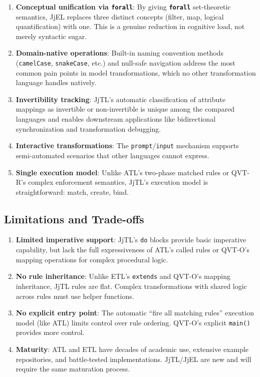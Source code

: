 \documentclass[11pt,a4paper]{article}
\newcommand{\jjel}{\textsf{JjEL}}
\newcommand{\jjtl}{\textsf{JjTL}}
\newcommand{\kw}[1]{\texttt{\textbf{#1}}}
\begin{document}
\begin{enumerate}
    \item \textbf{Conceptual unification via \kw{forall}}: By giving \kw{forall} set-theoretic semantics, \jjel{} replaces three distinct concepts (filter, map, logical quantification) with one. This is a genuine reduction in cognitive load, not merely syntactic sugar.

    \item \textbf{Domain-native operations}: Built-in naming convention methods (\texttt{camelCase}, \texttt{snakeCase}, etc.) and null-safe navigation address the most common pain points in model transformations, which no other transformation language handles natively.

    \item \textbf{Invertibility tracking}: \jjtl{}'s automatic classification of attribute mappings as invertible or non-invertible is unique among the compared languages and enables downstream applications like bidirectional synchronization and transformation debugging.

    \item \textbf{Interactive transformations}: The \texttt{prompt}/\texttt{input} mechanism supports semi-automated scenarios that other languages cannot express.

    \item \textbf{Single execution model}: Unlike ATL's two-phase matched rules or QVT-R's complex enforcement semantics, \jjtl{}'s execution model is straightforward: match, create, bind.
\end{enumerate}

\subsection{Limitations and Trade-offs}

\begin{enumerate}
    \item \textbf{Limited imperative support}: \jjtl{}'s \texttt{do} blocks provide basic imperative capability, but lack the full expressiveness of ATL's called rules or QVT-O's mapping operations for complex procedural logic.

    \item \textbf{No rule inheritance}: Unlike ETL's \texttt{extends} and QVT-O's mapping inheritance, \jjtl{} rules are flat. Complex transformations with shared logic across rules must use helper functions.

    \item \textbf{No explicit entry point}: The automatic ``fire all matching rules'' execution model (like ATL) limits control over rule ordering. QVT-O's explicit \texttt{main()} provides more control.

    \item \textbf{Maturity}: ATL and ETL have decades of academic use, extensive example repositories, and battle-tested implementations. \jjtl{}/\jjel{} are new and will require the same maturation process.
\end{enumerate}
\end{document}
